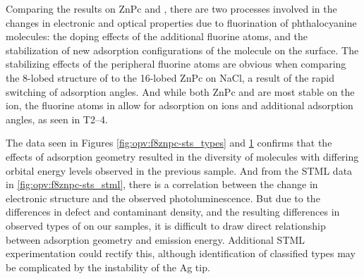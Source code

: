 \begin{figure} [h]
    \centering
    \caption{}
    \label{fig:opv:f8znpc-atomic_types}
\end{figure}


Comparing the results on ZnPc and , there are two processes involved in the changes in electronic and optical properties due to fluorination of phthalocyanine molecules: the doping effects of the additional fluorine atoms, and the stabilization of new adsorption configurations of the molecule on the surface. The stabilizing effects of the peripheral fluorine atoms are obvious when comparing the 8-lobed structure of  to the 16-lobed ZnPc on NaCl, a result of the rapid switching of adsorption angles. And while both ZnPc and  are most stable on the  ion, the fluorine atoms in  allow for adsorption on  ions and additional adsorption angles, as seen in T2--4.






The data seen in Figures \ref{fig:opv:f8znpc-sts_types} and \ref{fig:opv:f8znpc-atomic_types} confirms that the effects of adsorption geometry resulted in the diversity of molecules with differing orbital energy levels observed in the previous sample. And from the \ac{STML} data in \autoref{fig:opv:f8znpc-sts_stml}, there is a correlation between the change in electronic structure and the observed photoluminescence. But due to the differences in defect and contaminant density, and the resulting differences in observed types of  on our samples, it is difficult to draw direct relationship between adsorption geometry and emission energy. Additional \ac{STML} experimentation could rectify this, although identification of classified types may be complicated by the instability of the Ag tip.




